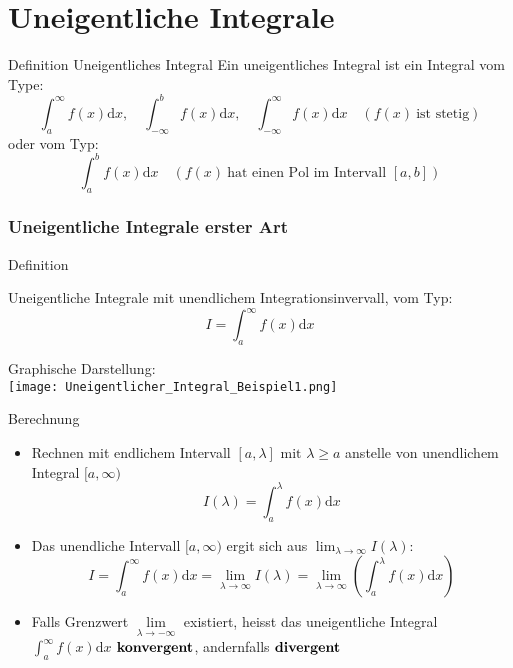\raggedcolumns
\columnbreak


\section{Uneigentliche Integrale}
\begin{definition}{Definition Uneigentliches Integral}
	Ein uneigentliches Integral ist ein Integral vom Type:
	\[\int_a^\infty{f(x)\mathrm{d}x}, \quad \int_{-\infty}^b{f(x)\mathrm{d}x}, \quad
	\int_{-\infty}^{\infty}{f(x)\mathrm{d}x} \quad (f(x) \: \text{ist stetig}) \]
	oder vom Typ:
	\[\int_a^b{f(x)\mathrm{d}x} \quad (f(x)\:\text{hat einen Pol im Intervall }[a,b]) \]
\end{definition}
\subsubsection{Uneigentliche Integrale erster Art}
\begin{definition}{Definition}\\
	\begin{minipage}{0.5\linewidth}
		Uneigentliche Integrale mit unendlichem Integrationsinvervall, vom Typ:
	\[I=\int_a^{\infty}{f(x)\mathrm{d}x} \]
	\end{minipage}
	\begin{minipage}{0.5\linewidth}
		\begin{center}
			Graphische Darstellung:\\
			\texttt{[image: Uneigentlicher\_Integral\_Beispiel1.png]}
		\end{center}
	\end{minipage}
\end{definition}
\begin{KR}{Berechnung}
\begin{itemize}
	\item Rechnen mit endlichem Intervall \([a,\lambda] \text{ mit } \lambda \ge a \) anstelle von unendlichem
		Integral \([a,\infty) \)
		\[I(\lambda)=\int_a^{\lambda}{f(x)\mathrm{d}x} \]
	\item Das unendliche Intervall \([a,\infty) \) ergit sich aus \(\lim_{\lambda \rightarrow
		\infty}I(\lambda) \):
		\[I=\int_a^{\infty}{f(x)\mathrm{d}x}=\underset{\lambda \rightarrow \infty}{\lim}I(\lambda)=
		\underset{\lambda \rightarrow \infty}{\lim}\left(\int_a^{\lambda}{f(x)\mathrm{d}x}\right) \]
    \item Falls Grenzwert \(\underset{\lambda \rightarrow -\infty}{\lim}\) existiert, heisst das uneigentliche
        Integral \(\displaystyle\int_{a}^\infty {f(x)\mathrm{d}x}\) \(\bold{konvergent}\), andernfalls 
        \(\bold{divergent}\)
\end{itemize}
\end{KR}


